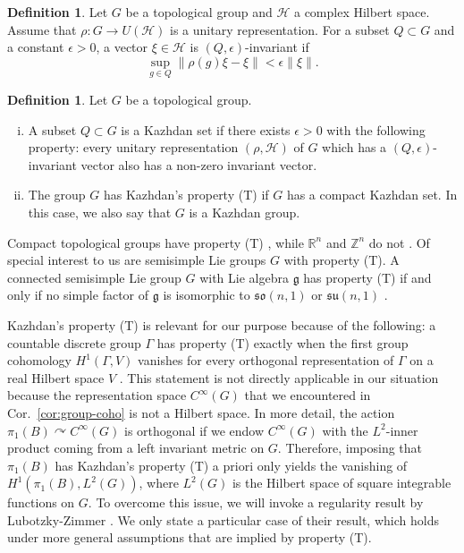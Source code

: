 \documentclass[11pt, letterpaper, oneside,reqno]{amsart}
\theoremstyle{plain}
\theoremstyle{underline}
\theoremstyle{definition}
\newtheorem{defi}[thm]{Definition}
\theoremstyle{remark}
\begin{document}
	\begin{defi}
		Let $G$ be a topological group and $\mathcal{H}$ a complex Hilbert space. Assume that $\rho:G\rightarrow U(\mathcal{H})$ is a unitary representation.
		For a subset $Q\subset G$ and a constant $\epsilon>0$, a vector $\xi\in\mathcal{H}$ is $(Q,\epsilon)$-invariant if
		\[
		\sup_{g\in Q}\|\rho(g)\xi-\xi\|<\epsilon\|\xi\|.
		\]
	\end{defi}
	
	
	\begin{defi}
		Let $G$ be a topological group. 
		\begin{enumerate}[i)]
			\item A subset $Q\subset G$ is a Kazhdan set if there exists $\epsilon>0$ with the following property: every unitary representation $(\rho,\mathcal{H})$ of $G$ which has a $(Q,\epsilon)$-invariant vector also has a non-zero invariant vector. 
			\item The group $G$ has Kazhdan's property (T) if $G$ has a compact Kazhdan set. In this case, we also say that $G$ is a Kazhdan group.
		\end{enumerate}
	\end{defi}
	
	Compact topological groups have property (T) \cite[Prop.~1.1.5]{Kazhdan}, while $\mathbb{R}^{n}$ and $\mathbb{Z}^{n}$ do not \cite[Ex.~1.1.7]{Kazhdan}. Of special interest to us are semisimple Lie groups $G$ with property (T). A connected semisimple Lie group $G$ with Lie algebra $\mathfrak{g}$ has property (T) if and only if no simple factor of $\mathfrak{g}$ is isomorphic to $\mathfrak{so}(n,1)$ or $\mathfrak{su}(n,1)$ \cite[Thm.~3.5.4]{Kazhdan}.
	
	\vspace{0.3cm}
	
	Kazhdan's property (T) is relevant for our purpose because of the following: a countable discrete group $\Gamma$ has property (T) exactly when the first group cohomology $H^{1}(\Gamma,V)$ vanishes for every orthogonal representation of $\Gamma$ on a real Hilbert space $V$  \cite[Chapter 2]{Kazhdan}. This statement is not directly applicable in our situation because the representation space $C^{\infty}(G)$ that we encountered in Cor.~\ref{cor:group-coho} is not a Hilbert space. In more detail, the action $\pi_1(B)\curvearrowright C^{\infty}(G)$ is orthogonal if we endow $C^{\infty}(G)$ with the $L^{2}$-inner product coming from a left invariant metric on $G$. Therefore, imposing that $\pi_1(B)$ has Kazhdan's property (T) a priori only yields the vanishing of $H^{1}(\pi_1(B),L^{2}(G))$, where $L^{2}(G)$ is the Hilbert space of square integrable functions on $G$.
	To overcome this issue, we will invoke a regularity result by Lubotzky-Zimmer \cite[Thm.~4.1]{Zimmer}. We only state a particular case of their result, which holds under more general assumptions that are implied by property (T). 
	
\end{document}

